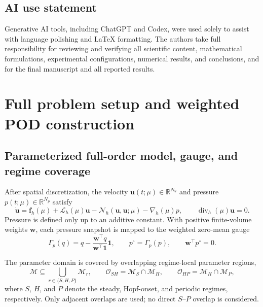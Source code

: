 \documentclass{article}
\begin{document}
\subsection*{AI use statement}
Generative AI tools, including ChatGPT and Codex, were used solely to assist with language polishing and LaTeX formatting. The authors take full responsibility for reviewing and verifying all scientific
content, mathematical formulations, experimental configurations, numerical
results, and conclusions, and for the final manuscript and all reported results.




\appendix
\section{Full problem setup and weighted POD construction}
\label{app:problem_pod}

\subsection{Parameterized full-order model, gauge, and regime coverage}

After spatial discretization, the velocity
$\bm u(t;\mu)\in\mathbb R^{N_u}$ and pressure
$p(t;\mu)\in\mathbb R^{N_p}$ satisfy
\begin{equation}
    \dot{\bm u}
    =
    \bm f_h(\mu)
    +\mathcal L_h(\mu)\bm u
    -\mathcal N_h(\bm u,\bm u;\mu)
    -\nabla_h(\mu)p,
    \qquad
    \operatorname{div}_h(\mu)\bm u=0.
    \label{eq:app_fom}
\end{equation}
Pressure is defined only up to an additive constant.
With positive finite-volume weights $\bm w$, each pressure snapshot is mapped
to the weighted zero-mean gauge
\begin{equation}
    \Gamma_p(q)
    =
    q-\frac{\bm w^\top q}{\bm w^\top\bm 1}\bm 1,
    \qquad
    p^\circ=\Gamma_p(p),
    \qquad
    \bm w^\top p^\circ=0.
    \label{eq:app_pressure_gauge}
\end{equation}

The parameter domain is covered by overlapping regime-local parameter regions,
\begin{equation}
    \mathcal M
    \subseteq
    \bigcup_{r\in\{S,H,P\}}\mathcal M_r,
    \qquad
    \mathcal O_{SH}
    =
    \mathcal M_S\cap\mathcal M_H,
    \qquad
    \mathcal O_{HP}
    =
    \mathcal M_H\cap\mathcal M_P,
    \label{eq:app_regime_cover}
\end{equation}
where $S$, $H$, and $P$ denote the steady, Hopf-onset, and periodic
regimes, respectively.
Only adjacent overlaps are used; no direct $S$--$P$ overlap is considered.
\end{document}

